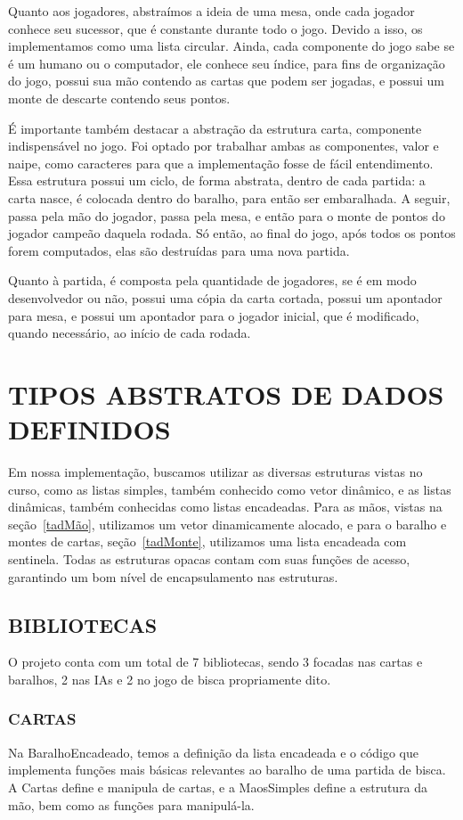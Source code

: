 \documentclass[12pt, oneside, a4paper, brazil]{abntex2}
\begin{document}
Quanto aos jogadores, abstraímos a ideia de uma mesa, onde cada jogador conhece seu sucessor, que é constante durante todo o jogo. Devido a isso, os implementamos como uma lista circular. Ainda, cada componente do jogo sabe se é um humano ou o computador, ele conhece seu índice, para fins de organização do jogo, possui sua mão contendo as cartas que podem ser jogadas, e possui um monte de descarte contendo seus pontos.

É importante também destacar a abstração da estrutura carta, componente indispensável no jogo. Foi optado por trabalhar ambas as componentes, valor e naipe, como caracteres para que a implementação fosse de fácil entendimento. Essa estrutura possui um ciclo, de forma abstrata, dentro de cada partida: a carta nasce, é colocada dentro do baralho, para então ser embaralhada. A seguir, passa pela mão do jogador, passa pela mesa, e então para o monte de pontos do jogador campeão daquela rodada. Só então, ao final do jogo, após todos os pontos forem computados, elas são destruídas para uma nova partida.

Quanto à partida, é composta pela quantidade de jogadores, se é em modo desenvolvedor ou não, possui uma cópia da carta cortada, possui um apontador para mesa, e possui um apontador para o jogador inicial, que é modificado, quando necessário, ao início de cada rodada.

\chapter{TIPOS ABSTRATOS DE DADOS DEFINIDOS}\label{cap:3}
Em nossa implementação, buscamos utilizar as diversas estruturas vistas no curso, como as listas simples, também conhecido como vetor dinâmico, e as listas dinâmicas, também conhecidas como listas encadeadas. Para as mãos, vistas na seção~\ref{tadMão}, utilizamos um vetor dinamicamente alocado, e para o baralho e montes de cartas, seção~\ref{tadMonte}, utilizamos uma lista encadeada com sentinela. Todas as estruturas opacas contam com suas funções de acesso, garantindo um bom nível de encapsulamento nas estruturas.

\section{BIBLIOTECAS}
O projeto conta com um total de 7 bibliotecas, sendo 3 focadas nas cartas e baralhos, 2 nas IAs e 2 no jogo de bisca propriamente dito.

\subsection{CARTAS}
Na BaralhoEncadeado, temos a definição da lista encadeada e o código que implementa funções mais básicas relevantes ao baralho de uma partida de bisca.
A Cartas define e manipula de cartas, e a MaosSimples define a estrutura da mão, bem como as funções para manipulá-la.
\end{document}
